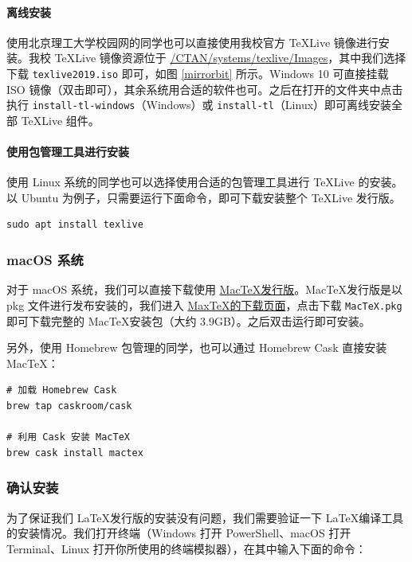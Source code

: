 \paragraph{离线安装} 使用北京理工大学校园网的同学也可以直接使用我校官方 \TeX Live 镜像进行安装。我校 \TeX Live 镜像资源位于 \href{https://mirrors.bit.edu.cn/CTAN/systems/texlive/Images}{/CTAN/systems/texlive/Images}，其中我们选择下载 \texttt{texlive2019.iso} 即可，如图 \ref{mirrorbit} 所示。Windows 10 可直接挂载 ISO 镜像（双击即可），其余系统用合适的软件也可。之后在打开的文件夹中点击执行 \texttt{install-tl-windows}（Windows）或 \texttt{install-tl}（Linux）即可离线安装全部 \TeX Live 组件。

\paragraph{使用包管理工具进行安装} 使用 Linux 系统的同学也可以选择使用合适的包管理工具进行 \TeX Live 的安装。以 Ubuntu 为例子，只需要运行下面命令，即可下载安装整个 \TeX Live 发行版。

\begin{verbatim}
sudo apt install texlive
\end{verbatim}

\subsubsection{macOS 系统}
对于 macOS 系统，我们可以直接下载使用 \href{https://www.tug.org/mactex/}{Mac\TeX 发行版}。Mac\TeX 发行版是以 pkg 文件进行发布安装的，我们进入 \href{https://www.tug.org/mactex/mactex-download.html}{Max\TeX 的下载页面}，点击下载 \texttt{MacTeX.pkg} 即可下载完整的 Mac\TeX 安装包（大约 3.9GB）。之后双击运行即可安装。

另外，使用 Homebrew 包管理的同学，也可以通过 Homebrew Cask 直接安装 Mac\TeX：

\begin{verbatim}
# 加载 Homebrew Cask
brew tap caskroom/cask

# 利用 Cask 安装 MacTeX
brew cask install mactex
\end{verbatim}

\subsubsection{确认安装}
为了保证我们 \LaTeX 发行版的安装没有问题，我们需要验证一下 \LaTeX 编译工具的安装情况。我们打开终端（Windows 打开 PowerShell、macOS 打开 Terminal、Linux 打开你所使用的终端模拟器），在其中输入下面的命令：

